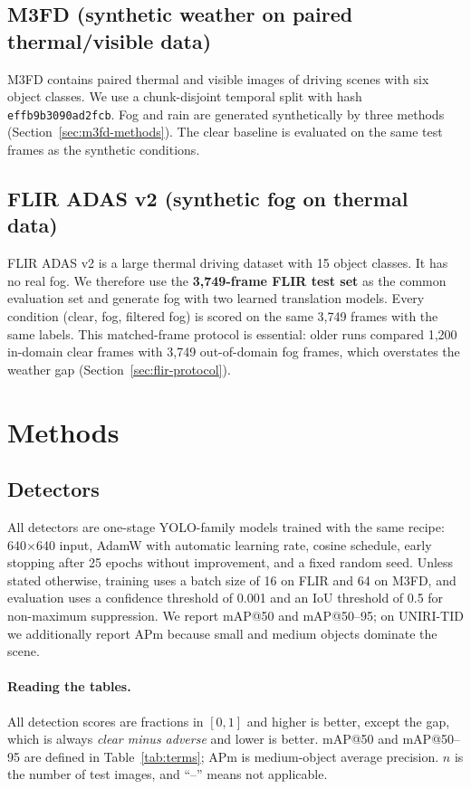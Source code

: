 \documentclass[11pt,a4paper]{article}
\begin{document}
\subsection{M3FD (synthetic weather on paired thermal/visible data)}
M3FD\cite{m3fd} contains paired thermal and visible images of driving scenes with six
object classes. We use a chunk-disjoint temporal split with hash
\texttt{effb9b3090ad2fcb}. Fog and rain are generated synthetically by three
methods (Section~\ref{sec:m3fd-methods}). The clear baseline is evaluated on the
same test frames as the synthetic conditions.

\subsection{FLIR ADAS v2 (synthetic fog on thermal data)}
FLIR ADAS v2\cite{flir} is a large thermal driving dataset with 15 object classes. It has
no real fog. We therefore use the \textbf{3,749-frame FLIR test set} as the
common evaluation set and generate fog with two learned translation models. Every condition (clear, fog, filtered fog) is scored on the
same 3,749 frames with the same labels. This matched-frame protocol is essential:
older runs compared 1,200 in-domain clear frames with 3,749 out-of-domain fog
frames, which overstates the weather gap (Section~\ref{sec:flir-protocol}).


\section{Methods}

\subsection{Detectors}
All detectors are one-stage YOLO-family models\cite{yolo} trained with the same recipe:
640$\times$640 input, AdamW with automatic learning rate, cosine schedule,
early stopping after 25 epochs without improvement, and a fixed random seed.
Unless stated otherwise, training uses a batch size of 16 on FLIR and 64 on
M3FD, and evaluation uses a confidence threshold of 0.001 and an IoU threshold
of 0.5 for non-maximum suppression. We report mAP@50 and mAP@50--95; on
UNIRI-TID we additionally report APm because small and medium objects dominate
the scene.

\paragraph{Reading the tables.}
All detection scores are fractions in $[0,1]$ and higher is better, except the
gap, which is always \emph{clear minus adverse} and lower is better. mAP@50 and
mAP@50--95 are defined in Table~\ref{tab:terms}; APm is medium-object average
precision. \(n\) is the number of test images, and ``--'' means not applicable.
\end{document}
